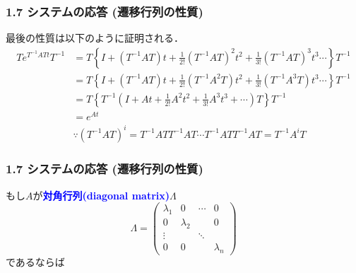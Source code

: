 \documentclass[10pt]{beamer}
\begin{document}
\begin{frame}[t]
\frametitle{1.7 システムの応答 (遷移行列の性質)}
最後の性質は以下のように証明される．
\begin{align}
 Te^{T^{-1}ATt}T^{-1}
 &= T\left\{
 I + (T^{-1}AT)t + \frac{1}{2!}(T^{-1}AT)^2t^2 +
 \frac{1}{3!}(T^{-1}AT)^3t^3 \cdots \right\}T^{-1}
\nonumber \\
 &= T\left\{
 I + (T^{-1}AT)t + \frac{1}{2!}(T^{-1}A^2T)t^2 +
 \frac{1}{3!}(T^{-1}A^3T)t^3 \cdots \right\}T^{-1}
\nonumber \\
 &= T\left\{
 T^{-1}\left(I + At + \frac{1}{2!}A^2t^2 +
 \frac{1}{3!}A^3t^3 + \cdots\right)T \right\}T^{-1}
\nonumber \\
 &= e^{At}
\\
 &  
 \because
 (T^{-1}AT)^i = T^{-1}ATT^{-1}AT\cdots T^{-1}ATT^{-1}AT = T^{-1}A^iT
\end{align}
\end{frame}


\begin{frame}[t]
\frametitle{1.7 システムの応答 (遷移行列の性質)}
もし$A$が\textcolor{blue}{\bf {対角行列}(diagonal matrix)}$\Lambda$
\begin{equation}
 \Lambda =
  \left(\begin{array}{cccc}
         \lambda_1 & 0         & \cdots & 0 \\
   0         & \lambda_2 &        & 0 \\
   \vdots    &           & \ddots & \\
   0         & 0         &        & \lambda_n
  \end{array}\right)
\end{equation}
であるならば
\end{frame}
\end{document}
